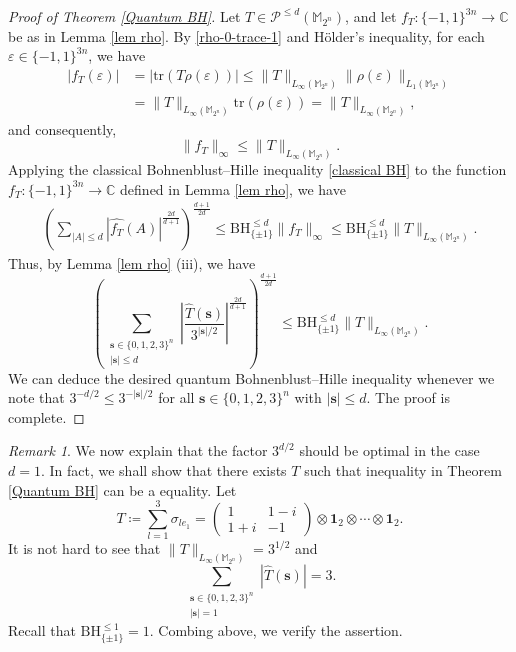 \documentclass{amsbook}
\theoremstyle{definition}
\theoremstyle{remark}
\newtheorem{remark}[theorem]{Remark}
\numberwithin{section}{chapter}
\numberwithin{equation}{chapter}
\newcommand{\M}{\mathbb{M}}
\newcommand{\1}{\mathbf{1}}
\newcommand{\s}{\mathbf{s}}
\begin{document}
\begin{proof}[Proof of Theorem \ref{Quantum BH}]
Let $T\in \mathcal{P}^{\leq d}(\M_{2^n})$, and let $f_{T}:\{-1,1\}^{3n}\to \mathbb{C}$ be as  in Lemma \ref{lem rho}. 	By \eqref{rho-0-trace-1} and H\"older's inequality, for each $\varepsilon\in \{-1,1\}^{3n}$, we  have
\begin{equation}
\begin{split}
	|f_T(\varepsilon)|&=	|\mathrm{tr}(T\rho(\varepsilon))|	\leq	\|T\|_{L_{\infty}(\mathbb{M}_{2^n})} \|\rho(\varepsilon)\|_{L_1(\M_{2^n})}	\\
&=	\|T\|_{L_{\infty}(\mathbb{M}_{2^n})} \mathrm{tr}(\rho(\varepsilon))	=	\|T\|_{L_{\infty}(\mathbb{M}_{2^n})},
\end{split}
\end{equation}
and	consequently,
	\begin{equation}\label{fa-a-infty}
	\|f_T\|_\infty\le \|T\|_{L_{\infty}(\mathbb{M}_{2^n})}.
	\end{equation}
Applying the classical Bohnenblust--Hille inequality \eqref{classical BH} to the function $f_{T}:\{-1,1\}^{3n}\to \mathbb{C}$ defined in Lemma \ref{lem rho}, we have
\begin{equation*}\label{transference to classical BH}
\begin{split}
\left(\sum_{|A|\leq d}|\widehat{f_T}(A)|^{\frac{2d}{d+1}}\right)^{\frac{d+1}{2d}}  
\leq \mathrm{BH}^{\leq d}_{\{\pm1\}}  \|f_T\|_{\infty}\leq \mathrm{BH}^{\leq d}_{\{\pm1\}} \|T\|_{L_{\infty}(\mathbb{M}_{2^n})} . 
\end{split}
\end{equation*}
Thus, by Lemma \ref{lem rho} (iii), we have
$$\left(\sum_{\substack{\s\in\{0,1,2,3\}^{n}\\|\s|\leq d}}\left|\frac{\widehat{T}(\s)}{3^{|\s|/2}}\right|^{\frac{2d}{d+1}}\right)^{\frac{d+1}{2d}}\leq  \mathrm{BH}^{\leq d}_{\{\pm1\}} \|T\|_{L_{\infty}(\mathbb{M}_{2^n})} .$$
We can deduce the  desired quantum Bohnenblust--Hille inequality whenever we  note that $3^{-d/2}\leq 3^{-|\s|/2}$ for all $\s\in\{0,1,2,3\}^{n}$ with $|\s|\leq d$. The proof is complete.
\end{proof}



\begin{remark}\label{rem BH 1}
We now explain that the factor $3^{d/2}$ should be optimal in the case $d=1$. In fact, we shall show that there exists $T$ such that inequality in Theorem \ref{Quantum BH} can be a equality.  Let 
\[
T\coloneqq \sum_{l=1}^{3}\sigma_{le_{1}}=
\begin{pmatrix}
1&1-i\\
1+i&-1
\end{pmatrix} \otimes \mathbf{1}_2\otimes \cdots \otimes\mathbf{1}_2.
\]
It is not hard to see that $\|T\|_{L_{\infty}(\mathbb{M}_{2^n})}=3^{1/2}$ and 
$$\sum_{\substack{\s\in\{0,1,2,3\}^{n}\\|\s|= 1}}|\widehat{T}(\s)|=3.$$
Recall that  $\mathrm{BH}^{\leq 1}_{\{\pm1\}}=1$. Combing above, we verify the assertion. 
\end{remark}
\end{document}
